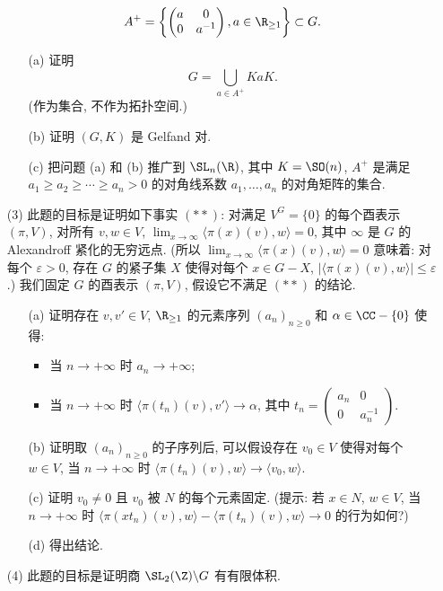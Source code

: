 \begin{enumerate}
\[
A^+ = \left\{\begin{pmatrix} a & 0 \\ 0 & a^{-1} \end{pmatrix}, a \in \R_{\geq 1}\right\} \subset G.
\]
\begin{enumerate}
\item[(a)] 证明
\[
G = \bigcup_{a \in A^+}KaK.
\]
(作为集合, 不作为拓扑空间.)
\item[(b)] 证明 $(G, K)$ 是 Gelfand 对.
\item[(c)] 把问题 (a) 和 (b) 推广到 $\SL_n(\R)$, 其中 $K = \SO(n)$, $A^+$ 是满足 $a_1 \geq a_2 \geq \cdots \geq a_n > 0$ 的对角线系数 $a_1, \ldots, a_n$ 的对角矩阵的集合.
\end{enumerate}
\item[(3)] 此题的目标是证明如下事实 $(**)$: 对满足 $V^G = \{0\}$ 的每个酉表示 $(\pi, V)$, 对所有 $v, w \in V$, $\lim_{x \to \infty}\langle \pi(x)(v), w \rangle = 0$, 其中 $\infty$ 是 $G$ 的 Alexandroff 紧化的无穷远点. (所以 $\lim_{x \to \infty}\langle \pi(x)(v), w \rangle = 0$ 意味着: 对每个 $\varepsilon > 0$, 存在 $G$ 的紧子集 $X$ 使得对每个 $x \in G - X$, $|\langle \pi(x)(v), w \rangle| \leq \varepsilon$.)
我们固定 $G$ 的酉表示 $(\pi, V)$, 假设它不满足 $(**)$ 的结论.
\begin{enumerate}
\item[(a)] 证明存在 $v, v' \in V$, $\R_{\geq 1}$ 的元素序列 $(a_n)_{n \geq 0}$ 和 $\alpha \in \CC - \{0\}$ 使得:
\begin{itemize}
\item 当 $n \to +\infty$ 时 $a_n \to +\infty$;
\item 当 $n \to +\infty$ 时 $\langle \pi(t_n)(v), v' \rangle \to \alpha$, 其中 $t_n = \begin{pmatrix} a_n & 0 \\ 0 & a_n^{-1} \end{pmatrix}$.
\end{itemize}
\item[(b)] 证明取 $(a_n)_{n \geq 0}$ 的子序列后, 可以假设存在 $v_0 \in V$ 使得对每个 $w \in V$, 当 $n \to +\infty$ 时 $\langle \pi(t_n)(v), w \rangle \to \langle v_0, w \rangle$.
\item[(c)] 证明 $v_0 \neq 0$ 且 $v_0$ 被 $N$ 的每个元素固定. (提示: 若 $x \in N$, $w \in V$, 当 $n \to +\infty$ 时 $\langle \pi(xt_n)(v), w \rangle - \langle \pi(t_n)(v), w \rangle \to 0$ 的行为如何?)
\item[(d)] 得出结论.
\end{enumerate}
\item[(4)] 此题的目标是证明商 $\SL_2(\Z)\backslash G$ 有有限体积.

\end{enumerate}
